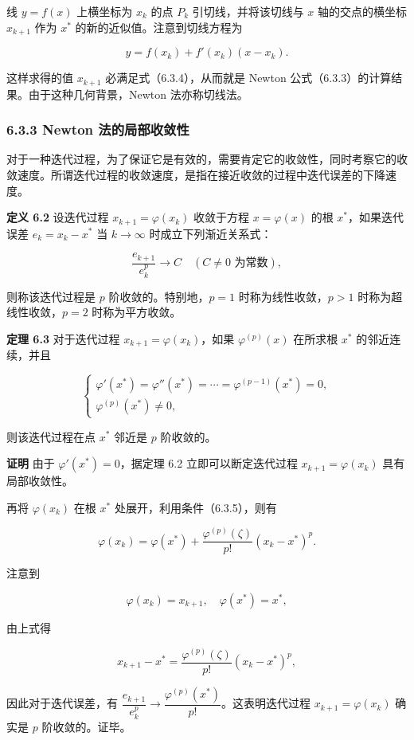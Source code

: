 \documentclass[
  10pt,
  fontset=fandol]{ctexart}
\begin{document}
线 \(y=f(x)\) 上横坐标为 \(x_k\) 的点 \(P_k\) 引切线，并将该切线与 \(x\) 轴的交点的横坐标 \(x_{k+1}\) 作为 \(x^*\) 的新的近似值。注意到切线方程为

\[
y=f(x_k)+f'(x_k)(x-x_k).
\]

这样求得的值 \(x_{k+1}\) 必满足式（6.3.4），从而就是 Newton 公式（6.3.3）的计算结果。由于这种几何背景，Newton 法亦称切线法。

\subsubsection{6.3.3 Newton 法的局部收敛性}\label{newton-ux6cd5ux7684ux5c40ux90e8ux6536ux655bux6027}

对于一种迭代过程，为了保证它是有效的，需要肯定它的收敛性，同时考察它的收敛速度。所谓迭代过程的收敛速度，是指在接近收敛的过程中迭代误差的下降速度。

\textbf{定义 6.2} 设迭代过程 \(x_{k+1}=\varphi(x_k)\) 收敛于方程 \(x=\varphi(x)\) 的根 \(x^*\)，如果迭代误差 \(e_k=x_k-x^*\) 当 \(k\to\infty\) 时成立下列渐近关系式：

\[
\frac{e_{k+1}}{e_k^p}\to C\quad(C\ne0\text{ 为常数}),
\]

则称该迭代过程是 \(p\) 阶收敛的。特别地，\(p=1\) 时称为线性收敛，\(p>1\) 时称为超线性收敛，\(p=2\) 时称为平方收敛。

\textbf{定理 6.3} 对于迭代过程 \(x_{k+1}=\varphi(x_k)\)，如果 \(\varphi^{(p)}(x)\) 在所求根 \(x^*\) 的邻近连续，并且

\[
\begin{cases}
\varphi'(x^*)=\varphi''(x^*)=\cdots=\varphi^{(p-1)}(x^*)=0,\\
\varphi^{(p)}(x^*)\ne0,
\end{cases}
\tag{6.3.5}
\]

则该迭代过程在点 \(x^*\) 邻近是 \(p\) 阶收敛的。

\textbf{证明} 由于 \(\varphi'(x^*)=0\)，据定理 6.2 立即可以断定迭代过程 \(x_{k+1}=\varphi(x_k)\) 具有局部收敛性。

再将 \(\varphi(x_k)\) 在根 \(x^*\) 处展开，利用条件（6.3.5），则有

\[
\varphi(x_k)=\varphi(x^*)+\frac{\varphi^{(p)}(\zeta)}{p!}(x_k-x^*)^p.
\]

注意到

\[
\varphi(x_k)=x_{k+1},\quad\varphi(x^*)=x^*,
\]

由上式得

\[
x_{k+1}-x^*=\frac{\varphi^{(p)}(\zeta)}{p!}(x_k-x^*)^p,
\]

因此对于迭代误差，有 \(\dfrac{e_{k+1}}{e_k^p}\to\dfrac{\varphi^{(p)}(x^*)}{p!}\)。这表明迭代过程 \(x_{k+1}=\varphi(x_k)\) 确实是 \(p\) 阶收敛的。证毕。
\end{document}
